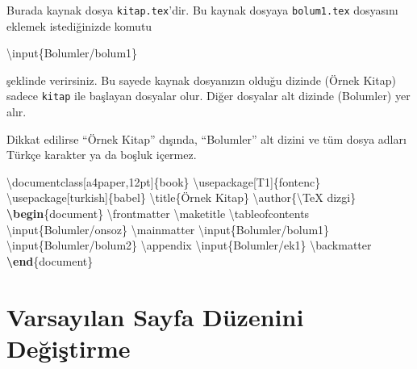 \documentclass[
  10pt,
]{scrbook}
\newenvironment{Shaded}{\begin{snugshade}}{\end{snugshade}}
\newcommand{\BuiltInTok}[1]{#1}
\newcommand{\ExtensionTok}[1]{#1}
\newcommand{\FunctionTok}[1]{\textcolor[rgb]{0.00,0.00,0.00}{#1}}
\newcommand{\KeywordTok}[1]{\textcolor[rgb]{0.13,0.29,0.53}{\textbf{#1}}}
\newcommand{\NormalTok}[1]{#1}
\theoremstyle{definition}
\theoremstyle{definition}
\theoremstyle{definition}
\theoremstyle{definition}
\theoremstyle{remark}
\begin{document}
Burada kaynak dosya \texttt{kitap.tex}'dir. Bu kaynak dosyaya \texttt{bolum1.tex} dosyasını eklemek istediğinizde komutu

\begin{Shaded}
\begin{Highlighting}[]
\FunctionTok{\textbackslash{}input}\NormalTok{\{Bolumler/bolum1\}}
\end{Highlighting}
\end{Shaded}

şeklinde verirsiniz. Bu sayede kaynak dosyanızın olduğu dizinde (Örnek Kitap) sadece \texttt{kitap} ile başlayan dosyalar olur. Diğer dosyalar alt dizinde (Bolumler) yer alır.

Dikkat edilirse ``Örnek Kitap'' dışında, ``Bolumler'' alt dizini ve tüm dosya adları Türkçe karakter ya da boşluk içermez.

\begin{Shaded}
\begin{Highlighting}[]
\BuiltInTok{\textbackslash{}documentclass}\NormalTok{[a4paper,12pt]\{}\ExtensionTok{book}\NormalTok{\}}
\BuiltInTok{\textbackslash{}usepackage}\NormalTok{[T1]\{}\ExtensionTok{fontenc}\NormalTok{\}}
\BuiltInTok{\textbackslash{}usepackage}\NormalTok{[turkish]\{}\ExtensionTok{babel}\NormalTok{\}}
\FunctionTok{\textbackslash{}title}\NormalTok{\{Örnek Kitap\}}
\FunctionTok{\textbackslash{}author}\NormalTok{\{}\FunctionTok{\textbackslash{}TeX}\NormalTok{ dizgi\}}
\KeywordTok{\textbackslash{}begin}\NormalTok{\{}\ExtensionTok{document}\NormalTok{\}}
\FunctionTok{\textbackslash{}frontmatter}
\FunctionTok{\textbackslash{}maketitle}
\FunctionTok{\textbackslash{}tableofcontents}
\FunctionTok{\textbackslash{}input}\NormalTok{\{Bolumler/onsoz\}}
\FunctionTok{\textbackslash{}mainmatter}
\FunctionTok{\textbackslash{}input}\NormalTok{\{Bolumler/bolum1\}}
\FunctionTok{\textbackslash{}input}\NormalTok{\{Bolumler/bolum2\}}
\FunctionTok{\textbackslash{}appendix}
\FunctionTok{\textbackslash{}input}\NormalTok{\{Bolumler/ek1\}}
\FunctionTok{\textbackslash{}backmatter}
\KeywordTok{\textbackslash{}end}\NormalTok{\{}\ExtensionTok{document}\NormalTok{\}}
\end{Highlighting}
\end{Shaded}

\hypertarget{varsayux131lan-sayfa-duxfczenini-deux11fiux15ftirme}{%
\section{Varsayılan Sayfa Düzenini Değiştirme}\label{varsayux131lan-sayfa-duxfczenini-deux11fiux15ftirme}}
\end{document}
